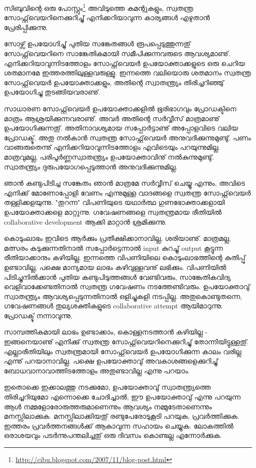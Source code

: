 ﻿
\vskip 2pt

സിബുവിന്റെ ഒരു പോസ്റ്റും\footnote{\url{http://cibu.blogspot.com/2007/11/blog-post.html}} അവിടുത്തെ കമന്റുകളും, സ്വതന്ത്ര സോഫ്റ്റ്‌വെയറിനെക്കുറിച്ചു് എനിക്കറിയാവുന്ന കാര്യങ്ങള്‍ എഴുതാന്‍ പ്രേരിപ്പിക്കുന്നു.

സോഴ്സ് ഉപയോഗിച്ചു് പുതിയ സങ്കേതങ്ങള്‍ രൂപപ്പെടുത്തുന്നതു് സോഫ്റ്റ്‌വെയറിനെ സാങ്കേതികമായി സമീപിക്കുന്നവരുടെ ആവശ്യമാണു്. എനിക്കറിയാവുന്നിടത്തോളം സോഫ്റ്റ്‌വെയര്‍ ഉപയോക്താക്കളുടെ ഒരു ചെറിയ ശതമാനമേ ഇത്തരത്തിലുള്ളവരുള്ളു. ഇന്നത്തെ വലിയൊരു ശതമാനം സ്വതന്ത്ര സോഫ്റ്റ്‌വെയര്‍ ഉപയോക്താക്കളും, അതിന്റെ സ്വാതന്ത്ര്യം തിരിച്ചറിഞ്ഞു് ഉപയോഗിച്ചു തുടങ്ങിയവരാണു്.

സാധാരണ സോഫ്റ്റ്‌വെയര്‍ ഉപയോക്താക്കളില്‍ ഭൂരിഭാഗവും പ്രോഡക്ടിനെ മാത്രം ആശ്രയിക്കുന്നവരാണു്. അവര്‍ അതിന്റെ സര്‍വ്വീസ് മാത്രമാണു് ഉപയോഗിക്കുന്നതു്. അതിനാവശ്യമായ സപ്പോര്‍ട്ടാണു് അപ്പോളവിടെ വലിയ പ്രോഡക്ടു്. അതു നല്‍കാന്‍ സ്വതന്ത്ര സോഫ്റ്റ്‌വെയര്‍ അനുവദിക്കുന്നുമുണ്ടു്. പണം വാങ്ങരുതെന്നു് എനിക്കറിയാവുന്നിടത്തോളം എവിടെയും പറയുന്നുമില്ല. മാത്രവുമല്ല, പരിപൂര്‍ണ്ണസ്വാതന്ത്ര്യം ഉപയോക്താവിനു് നല്‍കുന്നുമുണ്ടു്. സ്വാതന്ത്ര്യം ദുരുപയോഗപ്പെടുത്താന്‍ അനുവദിക്കുന്നുമില്ല.

ഞാന്‍ കണ്ടുപിടിച്ച സങ്കേതം ഞാന്‍ മാത്രമേ സര്‍വ്വീസ് ചെയ്യൂ എന്നും, അവിടെ എനിക്ക് മോണോപ്പോളി വേണം എന്നുമുള്ള വാദങ്ങളെ സ്വതന്ത്ര സോഫ്റ്റ്‌വെയര്‍ തള്ളിക്കളയുന്നു. "തുറന്ന" വിപണിയുടെ യഥാര്‍ത്ഥ ഗുണഭോക്താക്കളായി ഉപയോക്താക്കളെ മാറ്റുന്നു. ഗവേഷണങ്ങളെ സ്വതന്ത്രമായ രീതിയില്‍ collaborative development ആക്കി മാറ്റാന്‍ ശ്രമിക്കുന്നു.

കൊടുംലാഭം ഇവിടെ ആര്‍ക്കും പ്രതീക്ഷിക്കാനാവില്ല, ശരിയാണു്. മാത്രമല്ല, മത്സരം കടുക്കുന്നതിനാല്‍ സപ്പോര്‍ട്ടെന്നാല്‍ input കുറച്ചു് output കൂട്ടുന്ന രീതിയാക്കാനും കഴിയില്ല. ഇന്നത്തെ വിപണിയിലെ കൊടുംലാഭത്തിന്റെ കുതിപ്പു് ഉണ്ടാവില്ല, പക്ഷെ മാന്യമായ ലാഭം കഴിവുള്ളവനു് ലഭിക്കും. വിപണിയില്‍ പിടിച്ചുനില്‍ക്കാന്‍ പുതിയ കണ്ടുപിടുത്തങ്ങള്‍ വേണ്ടിവരും, സാങ്കേതികവിദ്യ വെളിവാക്കേണ്ടതിനാല്‍ സ്വതന്ത്ര ഗവേഷണം നടത്തേണ്ടിവരും. ഉപയോക്താവു് സ്വാതന്ത്ര്യം ആവശ്യപ്പെടുന്നതിനാല്‍ ഒളിച്ചുകളി നടപ്പില്ല. അതുകൊണ്ടുതന്നെ, ഗവേഷണങ്ങള്‍ തുല്യശക്തികളുടെ collaborative attempt ആയിമാറുന്നു. പ്രോഡക്ടു് നന്നാവുന്നു.

സാമ്പത്തികമായി ലാഭം ഉണ്ടാക്കാം, കൊള്ളനടത്താന്‍ കഴിയില്ല - ഇങ്ങനെയാണു് എനിക്കു് സ്വതന്ത്ര സോഫ്റ്റ്‌വെയറിനെക്കുറിച്ചു് തോന്നിയിട്ടുള്ളതു്. എല്ലാരീതിയിലും സ്വതന്ത്രമായി സോഫ്റ്റ്‌‌വെയര്‍ ഉപയോഗിക്കുന്ന കാലം വരില്ല എന്നു് പറയാനാവില്ല. പക്ഷെ ഉപയോക്താവു് അവകാശങ്ങളെക്കുറിച്ചു് ബോധവാനാവാത്തിടത്തോളം അതുണ്ടാവില്ല എന്നു പറയാം.

ഇതൊക്കെ ഇക്കാലത്തു നടക്കുമോ, ഉപയോക്താവു് സ്വാതന്ത്ര്യത്തെ തിരിച്ചറിയുമോ എന്നൊക്കെ ചോദിച്ചാല്‍, ഈ ഉപയോക്താവു് എന്നു പറയുന്ന ആള്‍ നമ്മളോരോരുത്തരുമാണെന്നും ആവശ്യം നമ്മുടേതാണെന്നും മനസ്സിലാക്കുക. മനസ്സിലാക്കിയതു് രണ്ടുപേരോടുകൂടി പറയുക, പ്രവര്‍ത്തിക്കുക. ഇത്തരം പ്രവര്‍ത്തനങ്ങള്‍ക്ക് ആകാവുന്ന സഹായം ചെയ്യുക. ലോകത്തില്‍ ഒരാശയവും പടര്‍ന്നുപന്തലിച്ചതു് ഒരു ദിവസം കൊണ്ടല്ല എന്നോര്‍ക്കുക.

